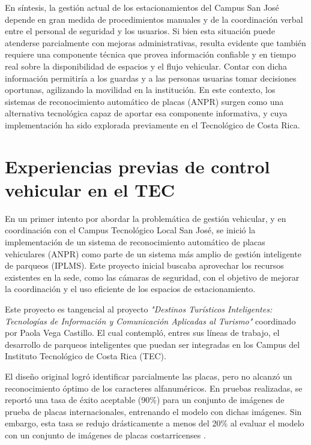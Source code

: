 En síntesis, la gestión actual de los estacionamientos del Campus San José
depende en gran medida de procedimientos manuales y de la coordinación verbal 
entre el personal de seguridad y los usuarios.
Si bien esta situación puede atenderse parcialmente con mejoras administrativas,
resulta evidente que también requiere una componente técnica que provea información confiable y
en tiempo real sobre la disponibilidad de espacios y el flujo vehicular.
Contar con dicha información permitiría a los guardas y a las personas usuarias tomar decisiones oportunas,
agilizando la movilidad en la institución.
En este contexto, los sistemas de reconocimiento automático de placas (ANPR)
surgen como una alternativa tecnológica capaz de aportar esa componente informativa,
y cuya implementación ha sido explorada previamente en el Tecnológico de Costa Rica.

\section{Experiencias previas de control vehicular en el TEC}

En un primer intento por abordar la problemática de gestión vehicular,
y en coordinación con el Campus Tecnológico Local San José,
se inició la implementación de un sistema de reconocimiento automático de placas vehiculares (ANPR)
como parte de un sistema más amplio de gestión inteligente de parqueos (IPLMS).
Este proyecto inicial buscaba aprovechar los recursos existentes en la sede,
como las cámaras de seguridad, con el objetivo de mejorar la coordinación y
el uso eficiente de los espacios de estacionamiento.

Este proyecto es tangencial al proyecto 
\textit{"Destinos Turísticos Inteligentes: Tecnologías de Información y Comunicación Aplicadas al Turismo"}
coordinado por Paola Vega Castillo.
El cual contempló, entres sus líneas de trabajo, el desarrollo de 
parqueos inteligentes que puedan ser integradas en los Campus del Instituto Tecnológico de Costa Rica (TEC).

El diseño original logró identificar parcialmente las placas,
pero no alcanzó un reconocimiento óptimo de los caracteres alfanuméricos.
En pruebas realizadas, se reportó una tasa de éxito aceptable (90\%)
para un conjunto de imágenes de prueba de placas internacionales, 
entrenando el modelo con dichas imágenes. Sin embargo,
esta tasa se redujo drásticamente a menos del 20\%
al evaluar el modelo con un conjunto de imágenes de placas costarricenses 
\cite{proyecto_previo}.

